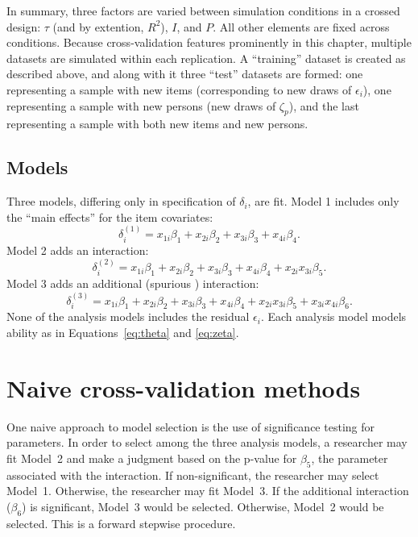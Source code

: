 \documentclass[12pt, letterpaper]{article}
\begin{document}
In summary, three factors are varied between simulation conditions in a crossed design: $\tau$ (and by extention, $R^2$), $I$, and $P$. All other elements are fixed across conditions. Because cross-validation features prominently in this chapter, multiple datasets are simulated within each replication. A ``training'' dataset is created as described above, and along with it three ``test'' datasets are formed: one representing a sample with new items (corresponding to new draws of $\epsilon_i$), one representing a sample with new persons (new draws of $\zeta_p$), and the last representing a sample with both new items and new persons.


\subsection{Models}

Three models, differing only in specification of $\delta_i$, are fit. Model 1 includes only the ``main effects'' for the item covariates:
\begin{equation}
\delta_i^{(1)} = x_{1i}\beta_1 + x_{2i}\beta_2 + x_{3i}\beta_3 + x_{4i}\beta_4
.\end{equation}
Model 2 adds an interaction:
\begin{equation}
\delta_i^{(2)} = x_{1i}\beta_1 + x_{2i}\beta_2 + x_{3i}\beta_3 + x_{4i}\beta_4
+ x_{2i}x_{3i}\beta_5
.\end{equation}
Model 3 adds an additional (spurious ) interaction:
\begin{equation}
\delta_i^{(3)} = x_{1i}\beta_1 + x_{2i}\beta_2 + x_{3i}\beta_3 + x_{4i}\beta_4
+ x_{2i}x_{3i}\beta_5 + x_{3i}x_{4i}\beta_6
.\end{equation}
None of the analysis models includes the residual $\epsilon_i$. Each analysis model models ability as in Equations~\ref{eq:theta} and \ref{eq:zeta}. %


\section{Naive cross-validation methods}

One naive approach to model selection is the use of significance testing for parameters. In order to select among the three analysis models, a researcher may fit Model~2 and make a judgment based on the p-value for $\beta_5$, the parameter associated with the interaction. If non-significant, the researcher may select Model~1. Otherwise, the researcher may fit Model~3. If the additional interaction ($\beta_6$) is significant, Model~3 would be selected. Otherwise, Model~2 would be selected. This is a forward stepwise procedure.
\end{document}

